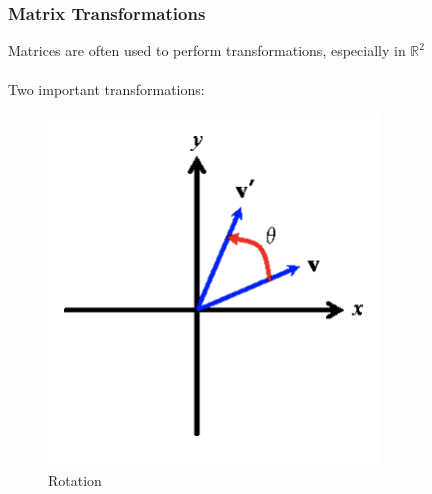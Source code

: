 \documentclass{beamer}
\begin{document}
\begin{frame}[t]\vspace{10pt}
\frametitle{Matrix Transformations}

Matrices are often used to perform transformations, especially 
\newline in $\mathbb{R}^2$ \\~\\
Two important transformations:

\begin{figure}[!tbp]
  \centering
  \begin{minipage}[b]{0.3\textwidth}
    \includegraphics[width=\textwidth]{./images/rotation.png}
    \caption{Rotation}
  \end{minipage}
  \hfill
  \begin{minipage}[b]{0.3\textwidth}

\end{minipage}
\end{figure}
\end{frame}
\end{document}
